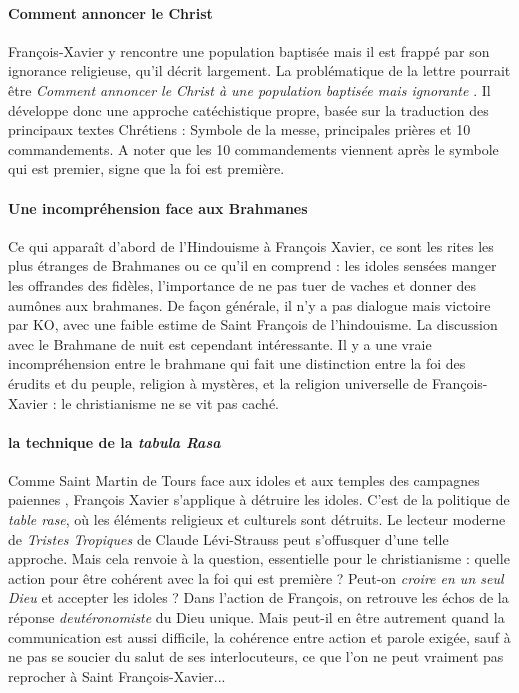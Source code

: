 \paragraph{Comment annoncer le Christ} François-Xavier y rencontre une population baptisée mais il est frappé par son ignorance religieuse, qu'il décrit largement. La problématique de la lettre pourrait être \textit{Comment annoncer le Christ à une population baptisée mais ignorante }.
Il développe donc une approche catéchistique propre, basée sur la traduction des principaux textes Chrétiens : Symbole de la messe, principales prières et 10 commandements.
A noter que les 10 commandements viennent après le symbole qui est premier, signe que la foi est première. 


\paragraph{Une incompréhension face aux Brahmanes} Ce qui apparaît d'abord  de l'Hindouisme à François Xavier, ce sont les rites les plus étranges de Brahmanes ou ce qu'il en comprend :  les idoles sensées manger les offrandes des fidèles, l'importance de ne pas tuer de vaches et donner des aumônes aux brahmanes. De façon générale, il n'y a pas dialogue mais victoire par KO, avec une faible estime de Saint François de l'hindouisme. La discussion avec le Brahmane de nuit est cependant intéressante. Il y a une vraie incompréhension entre
le brahmane qui fait une distinction entre la foi des érudits et
du peuple, religion à mystères, et la religion universelle de François-Xavier : le christianisme ne se vit pas caché. 


\paragraph{la technique de la \textit{tabula Rasa}} Comme Saint Martin de Tours face aux idoles et aux temples des campagnes paiennes , François Xavier s'applique à détruire les idoles. C'est de la politique de \textit{table rase}, où les éléments religieux et culturels sont détruits. Le lecteur moderne de \textit{Tristes Tropiques} de Claude Lévi-Strauss peut s'offusquer d'une telle approche.
Mais cela renvoie à la question, essentielle pour le christianisme :  quelle action pour être cohérent avec la foi qui est première ?  
 Peut-on \textit{croire en un seul Dieu} et accepter les idoles ?   Dans l'action de François, on retrouve les échos de la réponse \textit{deutéronomiste} du Dieu unique. Mais peut-il en être autrement  quand la communication est aussi difficile, la cohérence entre action et parole exigée, sauf à ne pas se soucier du salut de ses interlocuteurs, ce que l'on ne peut vraiment pas reprocher à Saint François-Xavier...
 
